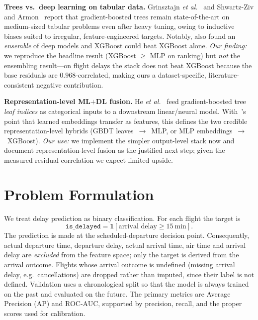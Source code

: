 \documentclass[conference]{IEEEtran}
\newcommand{\code}[1]{\texttt{#1}}
\begin{document}
\textbf{Trees vs.\ deep learning on tabular data.}
Grinsztajn \emph{et al.}~\cite{grinsztajn} and Shwartz-Ziv and
Armon~\cite{shwartzziv} report that gradient-boosted trees remain
state-of-the-art on medium-sized tabular problems even after heavy tuning, owing
to inductive biases suited to irregular, feature-engineered targets. Notably,
\cite{shwartzziv} also found an \emph{ensemble} of deep models and XGBoost could
beat XGBoost alone. \emph{Our finding:} we reproduce the headline result
(XGBoost $\geq$ MLP on ranking) but \emph{not} the ensembling result---on flight
delays the stack does not beat XGBoost because the base residuals are
$0.968$-correlated, making ours a dataset-specific, literature-consistent
negative contribution.

\textbf{Representation-level ML$+$DL fusion.}
He \emph{et al.}~\cite{fbgbdt} feed gradient-boosted tree \emph{leaf indices} as
categorical inputs to a downstream linear/neural model. With~\cite{entityembed}'s
point that learned embeddings transfer as features, this defines the two credible
representation-level hybrids (GBDT leaves~$\rightarrow$~MLP, or MLP
embeddings~$\rightarrow$~XGBoost). \emph{Our use:} we implement the simpler
output-level stack now and document representation-level fusion as the justified
next step; given the measured residual correlation we expect limited upside.

\section{Problem Formulation}
\label{sec:problem}
We treat delay prediction as binary classification. For each flight the target is
\begin{equation}
\code{is\_delayed} = \mathbf{1}\!\left[\text{arrival delay} \geq 15~\text{min}\right].
\end{equation}
The prediction is made at the scheduled-departure decision point. Consequently,
actual departure time, departure delay, actual arrival time, air time and
arrival delay are \emph{excluded} from the feature space; only the target is
derived from the arrival outcome. Flights whose arrival outcome is undefined
(missing arrival delay, e.g.\ cancellations) are dropped rather than imputed,
since their label is not defined. Validation uses a chronological split so that
the model is always trained on the past and evaluated on the future. The primary
metrics are Average Precision (AP) and ROC-AUC, supported by precision, recall,
and the proper scores used for calibration.
\end{document}
